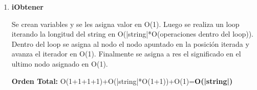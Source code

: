 \begin{enumerate}
\item\textbf{iObtener}
\par Se crean variables y se les asigna valor en O(1). Luego se realiza un loop iterando la longitud del string en O(|string|*O(operaciones dentro del loop)). Dentro del loop se asigna al nodo el nodo apuntado en la posición iterada y avanza el iterador en O(1). Finalmente se asigna a res el significado en el ultimo nodo asignado en O(1).
\par \textbf{Orden Total:} O(1+1+1+1)+O(|string|*O(1+1))+O(1)=\textbf{O(|string|)}

\end{enumerate}
